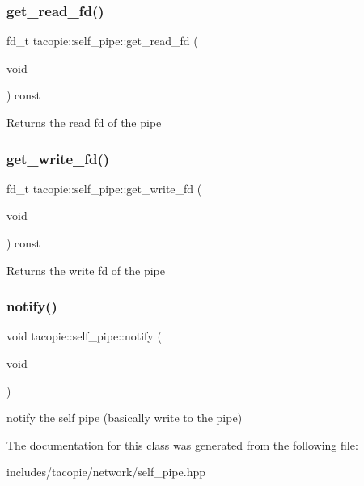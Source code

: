 \subsubsection{\texorpdfstring{get\+\_\+read\+\_\+fd()}{get\_read\_fd()}}
{\footnotesize\ttfamily fd\+\_\+t tacopie\+::self\+\_\+pipe\+::get\+\_\+read\+\_\+fd (\begin{DoxyParamCaption}\item[{void}]{ }\end{DoxyParamCaption}) const}

\begin{DoxyReturn}{Returns}
the read fd of the pipe 
\end{DoxyReturn}
\mbox{\label{classtacopie_1_1self__pipe_ab36a4deb45bb408988f26315aedc0d74}} 
\subsubsection{\texorpdfstring{get\+\_\+write\+\_\+fd()}{get\_write\_fd()}}
{\footnotesize\ttfamily fd\+\_\+t tacopie\+::self\+\_\+pipe\+::get\+\_\+write\+\_\+fd (\begin{DoxyParamCaption}\item[{void}]{ }\end{DoxyParamCaption}) const}

\begin{DoxyReturn}{Returns}
the write fd of the pipe 
\end{DoxyReturn}
\mbox{\label{classtacopie_1_1self__pipe_ade9e0e3d19b8d4d22977935a578d508e}} 
\subsubsection{\texorpdfstring{notify()}{notify()}}
{\footnotesize\ttfamily void tacopie\+::self\+\_\+pipe\+::notify (\begin{DoxyParamCaption}\item[{void}]{ }\end{DoxyParamCaption})}

notify the self pipe (basically write to the pipe) 

The documentation for this class was generated from the following file\+:\begin{DoxyCompactItemize}
\item 
includes/tacopie/network/self\+\_\+pipe.\+hpp\end{DoxyCompactItemize}
